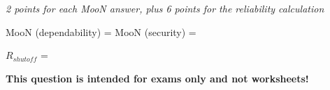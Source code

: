 {\it 2 points for each MooN answer, plus 6 points for the reliability calculation}

\vskip 10pt

MooN (dependability) =   \hskip 70pt MooN (security) = 

\vskip 10pt

$R_{shutoff}$ = 







{\bf This question is intended for exams only and not worksheets!}



